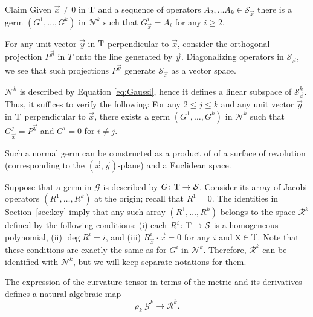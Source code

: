 \documentclass[a4paper,10pt]{article}
\begin{document}
\begin{thm}{Claim}\label{clm:allSX}
Given $\vec x\ne 0$ in $\mathrm{T}$ and a sequence of operators $A_2,\dots A_k\in \mathcal{S}_\vec x$ there is a germ $(G^1,\dots,G^k)$ in $\mathcal{N}^k$ such that $G^i_\vec x=A_i$ for any $i\ge 2$.
\end{thm}

For any unit vector  $\vec y$ in $\mathrm{T}$  perpendicular to $\vec x$, consider the orthogonal projection $P^{\vec y}$
in $T$ onto the line generated by $\vec y$.  Diagonalizing operators  in $\mathcal S _{\vec x}$, we see that
such projections $P^{\vec y}$ generate $\mathcal S _{\vec x}$ as a vector space. 

 $\mathcal N^k$ is described by  Equation \ref{eq:Gaussi}, hence it defines a linear subspace of $\mathcal S _{\vec x} ^k$.
Thus, it   suffices to  verify the following: For any $2\leq j \leq k$ and 
any unit vector  $\vec y$ in $\mathrm{T}$  perpendicular to $\vec x$, there exists a germ $(G^1,\dots,G^k)$ in $\mathcal{N}^k$ such that $G^j_\vec x=P^{\vec y}$ and $G^i =0$ for $i\neq j$.

 Such a normal germ can be constructed as a product of 
of a surface of revolution (corresponding to the $(\vec x ,\vec y)$-plane) and a Euclidean space.
%
\qeds


Suppose that a germ in $\mathcal{G}$ is described by $G\colon\mathrm{T}\to\mathcal{S}$.
Consider its array of Jacobi operators $(R^1,\dots,R^k)$ at the origin;
recall that $R^1=0$.
The identities in Section~\ref{sec:key} imply that any such array $(R^1,\dots,R^k)$ belongs to the space $\mathcal{R}^k$ defined by the following conditions: (i)
each $R^i\colon\mathrm{T}\to \mathcal{S}$ is a homogeneous polynomial,
(ii) $\deg R^i=i$,
and (iii) $R^i_\vec x\cdot \vec x=0$ for any $i$ and $\text{\sc{x}}\in\mathrm{T}$.
Note that these conditions are exactly the same as for $G^i$ in $\mathcal{N}^k$.
Therefore, $\mathcal{R}^k$ can be identified with $\mathcal{N}^k$, but we will keep separate notations for them.

The expression of the curvature tensor in terms of the metric and its derivatives defines a natural algebraic map 
$$\rho_k\:\mathcal{G}^k\to \mathcal{R}^k.$$
\end{document}
